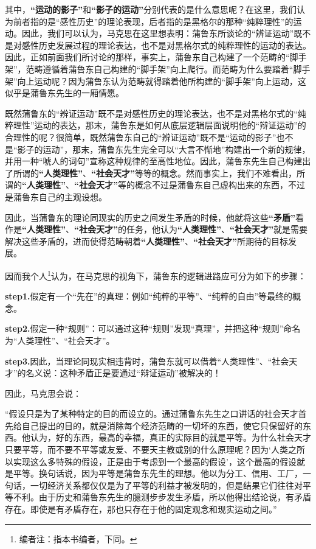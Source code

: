 \documentclass[a4paper,twoside,12pt,AutoFakeBold]{ctexart}
\begin{document}
其中，\textbf{“运动的影子”}和\textbf{“影子的运动”}分别代表的是什么意思呢？在这里，我们认为前者指的是“感性历史”的理论表现，后者指的是黑格尔的那种“纯粹理性”的运动。因此，我们可以认为，马克思在这里想表明：蒲鲁东所谈论的“辨证运动”既不是对感性历史发展过程的理论表达，也不是对黑格尔式的纯粹理性的运动的表达。因此，正如前面我们所讨论的那样，事实上，蒲鲁东自己构建了一个范畴的“脚手架”，范畴遵循着蒲鲁东自己构建的“脚手架”向上爬行。而范畴为什么要踏着“脚手架”向上运动呢？因为蒲鲁东认为范畴就得踏着他所构建的“脚手架”向上运动，这似乎是蒲鲁东先生的一厢情愿。

既然蒲鲁东的“辨证运动”既不是对感性历史的理论表达，也不是对黑格尔式的“纯粹理性”运动的表达，那末，蒲鲁东是如何从底层逻辑层面说明他的“辩证运动”的合理性的呢？很简单，既然蒲鲁东自己的“辨证运动”既不是“运动的影子”也不是“影子的运动”，那末，蒲鲁东先生完全可以“大言不惭地”构建出一个新的规律，并用一种“唬人的词句”宣称这种规律的至高性地位。因此，蒲鲁东先生自己构建出了所谓的\textbf{“人类理性”}、\textbf{“社会天才”}等等的概念。然而事实上，我们不难看出，所谓的\textbf{“人类理性”}、\textbf{“社会天才”}等的概念不过是蒲鲁东自己虚构出来的东西，不过是蒲鲁东自己的主观设想。

因此，当蒲鲁东的理论同现实的历史之间发生矛盾的时候，他就将这些\textbf{“矛盾”}看作是\textbf{“人类理性”}、\textbf{“社会天才”}的任务，他认为\textbf{“人类理性”}、\textbf{“社会天才”}就是需要解决这些矛盾的，进而使得范畴朝着\textbf{“人类理性”}、\textbf{“社会天才”}所期待的目标发展。

因而我个人\footnote{编者注：指本书编者，下同。}认为，在马克思的视角下，蒲鲁东的逻辑进路应可分为如下的步骤：


\begin{tcolorbox}[colback=gray!20, colframe=gray!100, sharp corners, leftrule={3pt}, rightrule={0pt}, toprule={0pt}, bottomrule={0pt}, left={2pt}, right={2pt}, top={3pt}, bottom={3pt}] 
\textbf{step1.}假定有一个“先在”的真理：例如“纯粹的平等”、“纯粹的自由”等最终的概念。

\textbf{step2.}假定一种“规则”：可以通过这种“规则”发现“真理”，并把这种“规则”命名为“人类理性”、“社会天才”。

\textbf{step3.}因此，当理论同现实相违背时，蒲鲁东就可以借着“人类理性”、“社会天才”的名义说：这种矛盾正是要通过“辩证运动”被解决的！


\end{tcolorbox}

因此，马克思会说：
\begin{adjustwidth}{2em}{2em}
    \qquad\fangsong
    “假设只是为了某种特定的目的而设立的。通过蒲鲁东先生之口讲话的社会天才首先给自己提出的目的，就是消除每个经济范畴的一切坏的东西，使它只保留好的东西。他认为，好的东西，最高的幸福，真正的实际目的就是平等。为什么社会天才只要平等，而不要不平等或友爱、不要天主教或别的什么原理呢？因为‘人类之所以实现这么多特殊的假设，正是由于考虑到一个最高的假设’，这个最高的假设就是平等。换句话说，因为平等是蒲鲁东先生的理想。他以为分工、信用、工厂，一句话，一切经济关系都仅仅是为了平等的利益才被发明的，但是结果它们往往对平等不利。由于历史和蒲鲁东先生的臆测步步发生矛盾，所以他得出结论说，有矛盾存在。即使是有矛盾存在，那也只存在于他的固定观念和现实运动之间。”
\end{adjustwidth}
\end{document}
